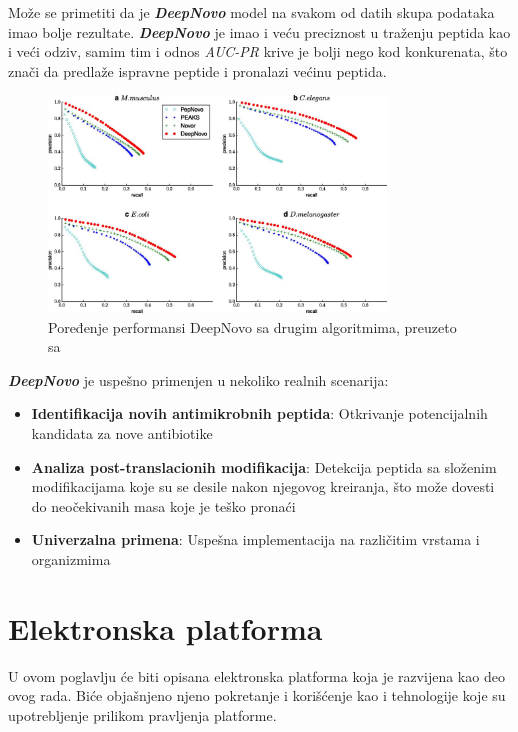 \documentclass[12pt,oneside]{memoir}
\begin{document}
Može se primetiti da je \textbf{\emph{DeepNovo}} model na svakom od datih skupa podataka imao bolje rezultate. \textbf{\emph{DeepNovo}} je imao i veću preciznost u traženju peptida kao i veći odziv, samim tim i odnos \emph{AUC-PR} krive je bolji nego kod konkurenata, što znači da predlaže ispravne peptide i pronalazi većinu peptida.

\begin{figure}[h]
\centering
\includegraphics[width=0.8\textwidth]{images/deep_novo_comparison.jpeg}
\caption{Poređenje performansi DeepNovo sa drugim algoritmima, preuzeto sa \cite{deepnovo}}
\label{fig:performanse}
\end{figure}

\textbf{\emph{DeepNovo}} je uspešno primenjen u nekoliko realnih scenarija:

\begin{itemize}
\item \textbf{Identifikacija novih antimikrobnih peptida}: Otkrivanje potencijalnih kandidata za nove antibiotike
\item \textbf{Analiza post-translacionih modifikacija}: Detekcija peptida sa složenim modifikacijama koje su se desile nakon njegovog kreiranja, što može dovesti do neočekivanih masa koje je teško pronaći
\item \textbf{Univerzalna primena}: Uspešna implementacija na različitim vrstama i organizmima
\end{itemize}


\chapter{Elektronska platforma}

U ovom poglavlju će biti opisana elektronska platforma koja je razvijena kao deo ovog rada. Biće objašnjeno njeno pokretanje i korišćenje kao i tehnologije koje su upotrebljenje prilikom pravljenja platforme.
\end{document}
